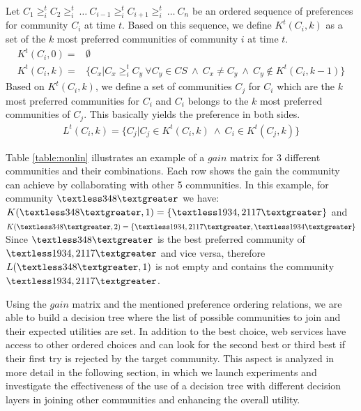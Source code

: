 Let $C_1 \geq_{i}^t C_2 \geq_{i}^t ~\dots~ C_{i-1} \geq_{i}^t C_{i+1} \geq_{i}^t ~\dots~ C_n$ be an ordered sequence of preferences for community $C_i$ at time $t$. Based on this sequence, we define $K^t(C_i, k)$ as a set of the $k$ most preferred communities of community $i$ at time $t$.
\begin{equation}\label{h_t_pref_top}
\begin{split}				
K^t(C_i, 0) = &\emptyset \\
K^t(C_i, k) = &\Big\{C_x | C_x \geq_{i}^t C_y ~\forall C_y \in CS ~\wedge~ C_x \neq C_y ~\wedge~ C_y \notin K^t(C_i, k-1) \Big\}				
\end{split}
\end{equation}
Based on $K^t(C_i, k)$, we define a set of communities $C_j$ for $C_i$ which are the $k$ most preferred communities for $C_i$ and $C_i$ belongs to the $k$ most preferred communities of $C_j$. This basically yields the preference in both sides.
\begin{equation}\label{l_t_top_both}
\begin{split}	
L^t(C_i,k) = \Big\{C_j | C_j \in K^t(C_i, k)~ \wedge~ C_i \in K^t(C_j, k)\Big\}
\end{split}
\end{equation}

Table \ref{table:nonlin} illustrates an example of a $gain$ matrix for 3 different communities and their combinations. Each row shows the gain the community can achieve by collaborating with other 5 communities. In this example, for community $\textless 348 \textgreater$ we have: \\
$K(\textless 348 \textgreater, 1) = \{\textless1934, 2117\textgreater\}$ and \\
$K(\textless 348 \textgreater, 2) = \{\textless1934, 2117\textgreater, \textless1934\textgreater\}$ \\
Since $\textless 348 \textgreater$ is the best preferred community of $\textless 1934, 2117 \textgreater$ and vice versa, therefore $L(\textless 348 \textgreater, 1)$ is not empty and contains the community $\textless1934, 2117\textgreater$.

Using the $gain$ matrix and the mentioned preference ordering relations, we are able to build a decision tree where the list of possible communities to join and their expected utilities are set.
In addition to the best choice, web services have access to other ordered choices and can look for the second best or third best if their first try is rejected by the target community. This aspect is analyzed in more detail in the following section, in which we launch experiments and investigate the effectiveness of the use of a decision tree with different decision layers in joining other communities and enhancing the overall utility.

